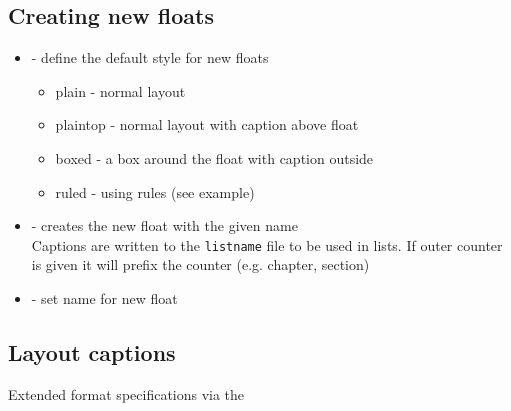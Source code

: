 \subsection{Creating new floats}
\begin{frame}
\end{frame}
\begin{frame}
	\begin{itemize}
		\item {} - define the default style for new floats\\
			\begin{itemize}
				\item plain - normal layout
				\item plaintop - normal layout with caption above float
				\item boxed - a box around the float with caption outside
				\item ruled - using rules (see example)
			\end{itemize}
		\item {} - creates the new float with the given name\\
				Captions are written to the \texttt{listname} file to be used in
				lists. If outer counter is given it will prefix the counter
				(e.g. chapter, section)
		\item {} - set name for new float
	\end{itemize}
\end{frame}

\subsection{Layout captions}
\begin{frame}
	Extended format specifications via the
\href{http://www.ctan.org/pkg/caption}{}

\end{frame}

